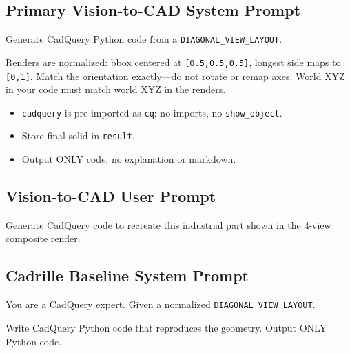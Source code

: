 \subsection{Primary Vision-to-CAD System Prompt}
\label{app:primary-vision-to-cad-system-prompt}

\begin{tcolorbox}[
    title=\texttt{SYSTEM\_PROMPT},
    colback=gray!4,
    colframe=gray!45,
    fonttitle=\bfseries,
    breakable,
    sharp corners,
    boxrule=0.5pt
]
\small
Generate CadQuery Python code from a \texttt{DIAGONAL\_VIEW\_LAYOUT}.

\vspace{0.5em}
Renders are normalized: bbox centered at \texttt{[0.5,0.5,0.5]}, longest side maps to \texttt{[0,1]}.
Match the orientation exactly---do not rotate or remap axes. World XYZ in your code must match world XYZ in the renders.

\begin{itemize}
    \item \texttt{cadquery} is pre-imported as \texttt{cq}; no imports, no \texttt{show\_object}.
    \item Store final solid in \texttt{result}.
    \item Output ONLY code, no explanation or markdown.
\end{itemize}
\end{tcolorbox}

\subsection{Vision-to-CAD User Prompt}
\label{app:vision-to-cad-user-prompt}

\begin{tcolorbox}[
    title=\texttt{USER\_PROMPT},
    colback=gray!4,
    colframe=gray!45,
    fonttitle=\bfseries,
    breakable,
    sharp corners,
    boxrule=0.5pt
]
\small
Generate CadQuery code to recreate this industrial part shown in the 4-view composite render.
\end{tcolorbox}

\subsection{Cadrille Baseline System Prompt}
\label{app:cadrille-system-prompt}

\begin{tcolorbox}[
    title=\texttt{CADRILLE\_SYSTEM\_PROMPT},
    colback=gray!4,
    colframe=gray!45,
    fonttitle=\bfseries,
    breakable,
    sharp corners,
    boxrule=0.5pt
]
\small
You are a CadQuery expert. Given a normalized \texttt{DIAGONAL\_VIEW\_LAYOUT}.

\vspace{0.5em}
Write CadQuery Python code that reproduces the geometry. Output ONLY Python code.
\end{tcolorbox}



